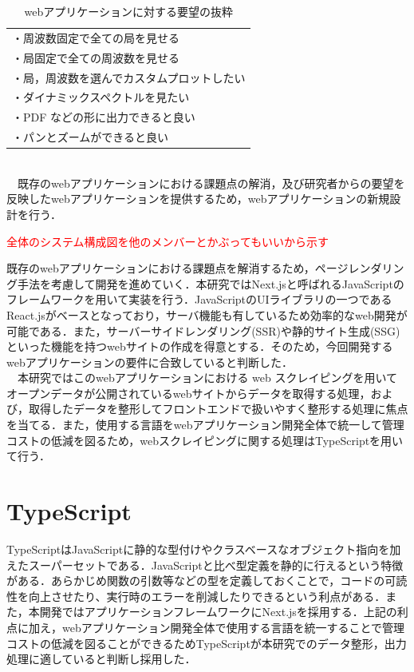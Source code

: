 \begin{table}[h]
  \centering
  \caption{webアプリケーションに対する要望の抜粋}
  \begin{tabular}{l}
  \toprule
    ・周波数固定で全ての局を見せる\\
    ・局固定で全ての周波数を見せる\\
    ・局，周波数を選んでカスタムプロットしたい\\
    ・ダイナミックスペクトルを見たい\\
    ・PDF などの形に出力できると良い\\
    ・パンとズームができると良い
  \end{tabular}
\end{table}\\
　既存のwebアプリケーションにおける課題点の解消，及び研究者からの要望を反映したwebアプリケーションを提供するため，webアプリケーションの新規設計を行う．

\textcolor{red}{全体のシステム構成図を他のメンバーとかぶってもいいから示す}

既存のwebアプリケーションにおける課題点を解消するため，ページレンダリング手法を考慮して開発を進めていく．本研究ではNext.jsと呼ばれるJavaScriptのフレームワークを用いて実装を行う．JavaScriptのUIライブラリの一つであるReact.jsがベースとなっており，サーバ機能も有しているため効率的なweb開発が可能である．また，サーバーサイドレンダリング(SSR)や静的サイト生成(SSG)といった機能を持つwebサイトの作成を得意とする．そのため，今回開発するwebアプリケーションの要件に合致していると判断した．\cite{next}\\
　本研究ではこのwebアプリケーションにおける web スクレイピングを用いてオープンデータが公開されているwebサイトからデータを取得する処理，および，取得したデータを整形してフロントエンドで扱いやすく整形する処理に焦点を当てる．また，使用する言語をwebアプリケーション開発全体で統一して管理コストの低減を図るため，webスクレイピングに関する処理はTypeScriptを用いて行う．\\

 \section{TypeScript}
 TypeScriptはJavaScriptに静的な型付けやクラスベースなオブジェクト指向を加えたスーパーセットである．JavaScriptと比べ型定義を静的に行えるという特徴がある．あらかじめ関数の引数等などの型を定義しておくことで，コードの可読性を向上させたり、実行時のエラーを削減したりできるという利点がある．また，本開発ではアプリケーションフレームワークにNext.jsを採用する．上記の利点に加え，webアプリケーション開発全体で使用する言語を統一することで管理コストの低減を図ることができるためTypeScriptが本研究でのデータ整形，出力処理に適していると判断し採用した．

